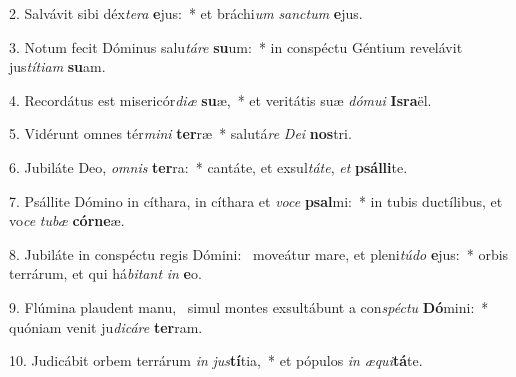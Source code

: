 2. Salvávit sibi déx\textit{te}\textit{ra} \textbf{e}jus:~*  et bráchi\textit{um} \textit{sanc}\textit{tum} \textbf{e}jus.\

3. Notum fecit Dóminus salu\textit{tá}\textit{re} \textbf{su}um:~*  in conspéctu Géntium revelávit jus\textit{tí}\textit{ti}\textit{am} \textbf{su}am.\

4. Recordátus est misericór\textit{di}\textit{æ} \textbf{su}æ,~*  et veritátis suæ \textit{dó}\textit{mu}\textit{i} \textbf{Is}\textbf{ra}ël.\

5. Vidérunt omnes tér\textit{mi}\textit{ni} \textbf{ter}ræ~*  salutá\textit{re} \textit{De}\textit{i} \textbf{nos}tri.\

6. Jubiláte Deo, \textit{om}\textit{nis} \textbf{ter}ra:~*  cantáte, et exsul\textit{tá}\textit{te}, \textit{et} \textbf{psál}\textbf{li}te.\

7. Psállite Dómino in cíthara, in cíthara et \textit{vo}\textit{ce} \textbf{psal}mi:~*  in tubis ductílibus, et vo\textit{ce} \textit{tu}\textit{bæ} \textbf{cór}\textbf{ne}æ.\

8. Jubiláte in conspéctu regis Dómini: \dag\  moveátur mare, et pleni\textit{tú}\textit{do} \textbf{e}jus:~*  orbis terrárum, et qui há\textit{bi}\textit{tant} \textit{in} \textbf{e}o.\

9. Flúmina plaudent manu, \dag\  simul montes exsultábunt a con\textit{spéc}\textit{tu} \textbf{Dó}mini:~*  quóniam venit ju\textit{di}\textit{cá}\textit{re} \textbf{ter}ram.\

10. Judicábit orbem terrárum \textit{in} \textit{jus}\textbf{tí}tia,~*  et pópulos \textit{in} \textit{æ}\textit{qui}\textbf{tá}te.\

